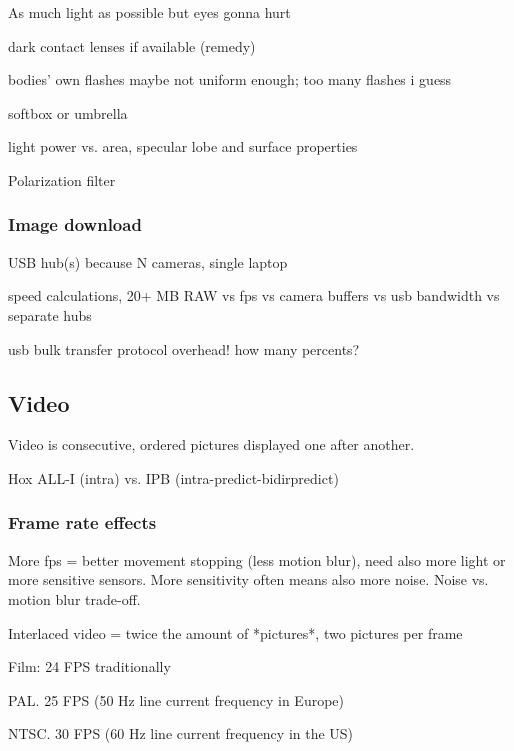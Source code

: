 As much light as possible but eyes gonna hurt

dark contact lenses if available (remedy)

bodies' own flashes maybe not uniform enough; too many flashes i guess

softbox or umbrella

light power vs. area, specular lobe and surface properties


Polarization filter


\subsubsection{Image download} %

USB hub(s) because N cameras, single laptop

speed calculations, 20+ MB RAW vs fps vs camera buffers vs usb bandwidth vs separate hubs

usb bulk transfer protocol overhead! how many percents?


\subsection{Video}

Video is consecutive, ordered pictures displayed one after another.

Hox ALL-I (intra) vs. IPB (intra-predict-bidirpredict)

\subsubsection{Frame rate effects}

More fps = better movement stopping (less motion blur), need also more light or more sensitive sensors. More sensitivity often means also more noise. Noise vs. motion blur trade-off.

Interlaced video = twice the amount of *pictures*, two pictures per frame

Film: 24 FPS traditionally

PAL. 25 FPS (50 Hz line current frequency in Europe)

NTSC. 30 FPS (60 Hz line current frequency in the US)

